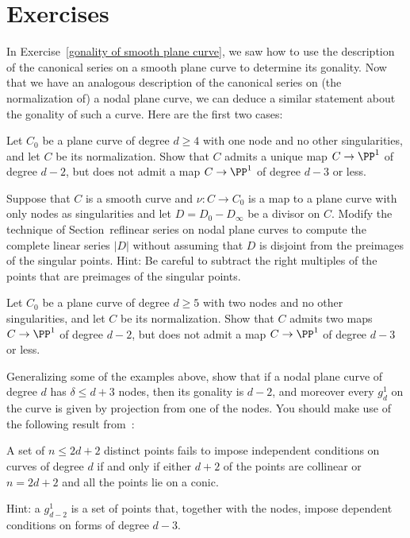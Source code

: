 \section{Exercises}


In Exercise~\ref{gonality of smooth plane curve}, we saw how to use the description of the canonical series on a smooth plane curve to determine its gonality. Now that we have an analogous description of the canonical series on (the normalization of) a nodal plane curve, we can deduce a similar statement about the gonality of such a curve. Here are the first two cases: 

\begin{exercise}
Let $C_0$ be a plane curve of degree $d\geq 4$ with one node and no other singularities, and let $C$ be its normalization. Show that $C$ admits a unique map $C \to \PP^1$ of degree $d-2$, but does not admit a map $C \to \PP^1$ of degree $d-3$ or less.
\end{exercise}

\begin{exercise}\label{general case of divisors on nodal curves}
Suppose that $C$ is a smooth curve and $\nu: C \to C_0$ is a map to a plane curve with
only nodes as singularities and let $D = D_0-D_\infty$ be a divisor on $C$. Modify the 
technique of Section~ref{linear series on nodal plane curves} to compute the complete
linear series $|D|$ without assuming that $D$ is disjoint from the preimages of the singular
points. 
Hint: Be careful to subtract the right multiples of the points that are preimages of the singular
points.
\end{exercise}

\begin{exercise}
Let $C_0$ be a plane curve of degree $d\geq 5$ with two nodes and no other singularities, and let $C$ be its normalization. Show that $C$ admits two maps $C \to \PP^1$ of degree $d-2$, but does not admit a map $C \to \PP^1$ of degree $d-3$ or less.
\end{exercise}

\begin{exercise}
Generalizing some of the examples above, show that if a nodal plane curve of degree $d$ has $\delta\leq d+3$ nodes,
then its gonality is $d-2$, and moreover every $g^1_d$ on the curve is given by projection from one of the nodes.
You should make use of the following result from~\cite[p. 302]{MR1376653}:
\begin{proposition}
 A set of $n \leq 2d+ 2$ distinct
points fails to impose independent conditions on curves of degree
$d$ if and only if either $d + 2$ of the points  are collinear or $n = 2d + 2$ and all the points lie
on a conic.
\end{proposition} 
Hint: a $g^1_{d-2}$ is a set of points that, together with the nodes, impose dependent conditions on forms of degree $d-3$.
\end{exercise}


